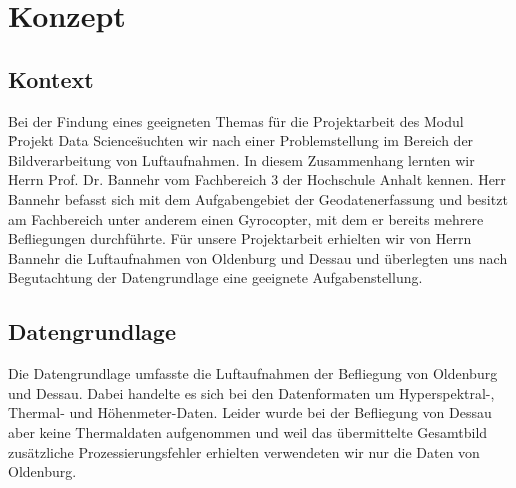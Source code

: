 
\newcommand{\Heading}{Team Gyrocopter}
\newcommand{\Modul}{Projekt Data Science}

\newcommand{\Dozent}{Dozent: Prof. Dr. Christian Hänig}





\chapter{Konzept}\thispagestyle{fancy}

\section{Kontext}

Bei der Findung eines geeigneten Themas für die Projektarbeit des Modul \"Projekt Data Science\" suchten wir
nach einer Problemstellung im Bereich der Bildverarbeitung von Luftaufnahmen.
In diesem Zusammenhang lernten wir Herrn Prof. Dr. Bannehr vom Fachbereich 3 der Hochschule Anhalt kennen.
Herr Bannehr befasst sich mit dem Aufgabengebiet der Geodatenerfassung und besitzt am Fachbereich unter anderem einen
Gyrocopter, mit dem er bereits mehrere Befliegungen durchführte.
Für unsere Projektarbeit erhielten wir von Herrn Bannehr die Luftaufnahmen von Oldenburg und Dessau und überlegten uns
nach Begutachtung der Datengrundlage eine geeignete Aufgabenstellung.

\section{Datengrundlage}
Die Datengrundlage umfasste die Luftaufnahmen der Befliegung von Oldenburg und Dessau.
Dabei handelte es sich bei den Datenformaten um Hyperspektral-, Thermal- und Höhenmeter-Daten.
Leider wurde bei der Befliegung von Dessau aber keine Thermaldaten aufgenommen und weil das übermittelte Gesamtbild
zusätzliche Prozessierungsfehler erhielten verwendeten wir nur die Daten von Oldenburg.

